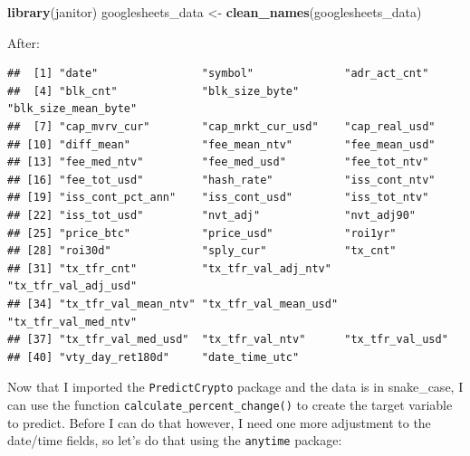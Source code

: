 \documentclass[
]{book}
\newenvironment{Shaded}{\begin{snugshade}}{\end{snugshade}}
\newcommand{\KeywordTok}[1]{\textcolor[rgb]{0.13,0.29,0.53}{\textbf{#1}}}
\newcommand{\NormalTok}[1]{#1}
\newcommand{\OperatorTok}[1]{\textcolor[rgb]{0.81,0.36,0.00}{\textbf{#1}}}
\newcommand{\StringTok}[1]{\textcolor[rgb]{0.31,0.60,0.02}{#1}}
\begin{document}
\begin{Shaded}
\begin{Highlighting}[]
\KeywordTok{library}\NormalTok{(janitor)}
\NormalTok{googlesheets_data <-}\StringTok{ }\KeywordTok{clean_names}\NormalTok{(googlesheets_data)}
\end{Highlighting}
\end{Shaded}

After:

\begin{verbatim}
##  [1] "date"                "symbol"              "adr_act_cnt"        
##  [4] "blk_cnt"             "blk_size_byte"       "blk_size_mean_byte" 
##  [7] "cap_mvrv_cur"        "cap_mrkt_cur_usd"    "cap_real_usd"       
## [10] "diff_mean"           "fee_mean_ntv"        "fee_mean_usd"       
## [13] "fee_med_ntv"         "fee_med_usd"         "fee_tot_ntv"        
## [16] "fee_tot_usd"         "hash_rate"           "iss_cont_ntv"       
## [19] "iss_cont_pct_ann"    "iss_cont_usd"        "iss_tot_ntv"        
## [22] "iss_tot_usd"         "nvt_adj"             "nvt_adj90"          
## [25] "price_btc"           "price_usd"           "roi1yr"             
## [28] "roi30d"              "sply_cur"            "tx_cnt"             
## [31] "tx_tfr_cnt"          "tx_tfr_val_adj_ntv"  "tx_tfr_val_adj_usd" 
## [34] "tx_tfr_val_mean_ntv" "tx_tfr_val_mean_usd" "tx_tfr_val_med_ntv" 
## [37] "tx_tfr_val_med_usd"  "tx_tfr_val_ntv"      "tx_tfr_val_usd"     
## [40] "vty_day_ret180d"     "date_time_utc"
\end{verbatim}

Now that I imported the \texttt{PredictCrypto} package and the data is in snake\_case, I can use the function \texttt{calculate\_percent\_change()} to create the target variable to predict. Before I can do that however, I need one more adjustment to the date/time fields, so let's do that using the \texttt{anytime}\citep{R-anytime} package:

\begin{Shaded}
\end{Shaded}
\end{document}
